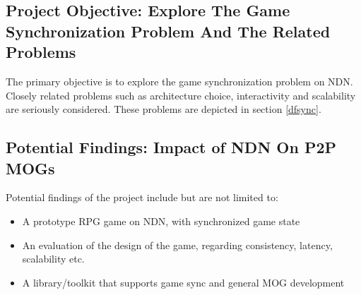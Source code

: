 \documentclass{article}
\begin{document}
\subsection{Project Objective: Explore The Game Synchronization Problem And The Related Problems}
The primary objective is to explore the game synchronization problem on NDN. Closely related problems such as architecture choice, interactivity and scalability are seriously considered. These problems are depicted in section \ref{dfsync}.




\subsection{Potential Findings: Impact of NDN On P2P MOGs}
Potential findings of the project include but are not limited to:
\begin{itemize}
\item A prototype RPG game on NDN, with synchronized game state
\item An evaluation of the design of the game, regarding consistency, latency, scalability etc.
\item A library/toolkit that supports game sync and general MOG development
\end{itemize}
\end{document}
